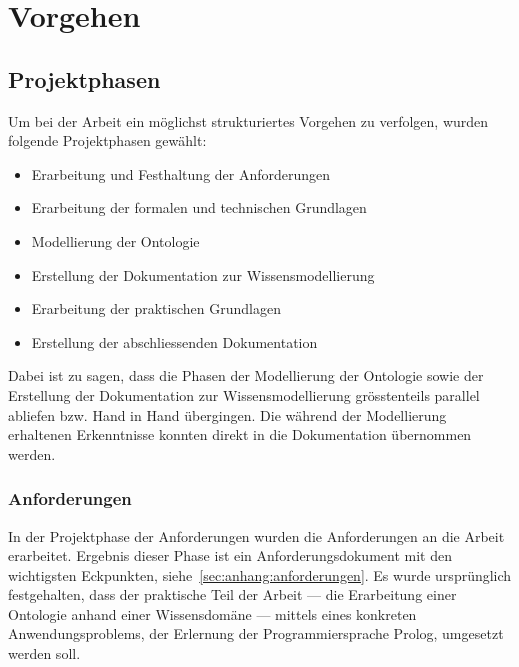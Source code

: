 \chapter{Vorgehen}
\label{chap:vorgehen}

\section{Projektphasen}
\label{sec:projektphasen}

Um bei der Arbeit ein möglichst strukturiertes Vorgehen zu verfolgen, wurden folgende Projektphasen gewählt:
\begin{itemize}
\item Erarbeitung und Festhaltung der Anforderungen
\item Erarbeitung der formalen und technischen Grundlagen
\item Modellierung der Ontologie
\item Erstellung der Dokumentation zur Wissensmodellierung
\item Erarbeitung der praktischen Grundlagen
\item Erstellung der abschliessenden Dokumentation
\end{itemize}

Dabei ist zu sagen, dass die Phasen der Modellierung der Ontologie sowie der Erstellung der Dokumentation zur Wissensmodellierung grösstenteils parallel abliefen bzw. Hand in Hand übergingen. Die während der Modellierung erhaltenen Erkenntnisse konnten direkt in die Dokumentation übernommen werden.

\subsection{Anforderungen}
\label{subsec:anforderungen}
In der Projektphase der Anforderungen wurden die Anforderungen an die Arbeit erarbeitet. Ergebnis dieser Phase ist ein Anforderungsdokument mit den wichtigsten Eckpunkten, siehe~\autoref{sec:anhang:anforderungen}. Es wurde ursprünglich festgehalten, dass der praktische Teil der Arbeit --- die Erarbeitung einer Ontologie anhand einer Wissensdomäne --- mittels eines konkreten Anwendungsproblems, der Erlernung der Programmiersprache Prolog, umgesetzt werden soll. 

